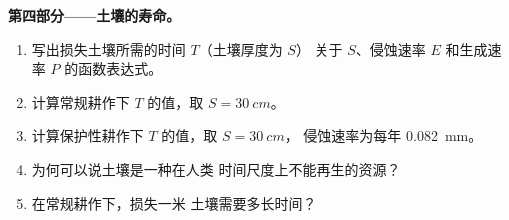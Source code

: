 \begin{problem}
\medskip
\noindent\textbf{第四部分——土壤的寿命。}
\begin{enumerate}[resume]
  \item 写出损失土壤所需的时间 $T$（土壤厚度为 $S$）
        关于 $S$、侵蚀速率 $E$ 和生成速率 $P$ 的函数表达式。
  \item 计算常规耕作下 $T$ 的值，取 $S = \qty{30}{cm}$。
  \item 计算保护性耕作下 $T$ 的值，取 $S = \qty{30}{cm}$，
        侵蚀速率为每年 \qty{0.082}{mm}。
  \item 为何可以说土壤是一种在人类
        时间尺度上不能再生的资源？
  \item 在常规耕作下，损失一米
        土壤需要多长时间？
\end{enumerate}
\end{problem}
